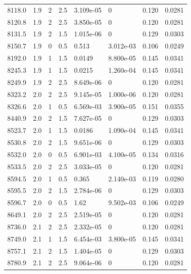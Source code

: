 \documentclass[preview]{standalone}
\begin{document}
{{{{{\begin{tabular}{L{1.2cm}C{1.2cm} C{0.3cm}C{0.5cm} C{1.4cm}C{1.4cm} C{1.4cm}C{1.4cm}}
  8118.0  &   1.9  & 2     & 2.5 &  3.109e-05  & 0  & 0.120 &  0.0281   \\ 
  8120.8  &   1.9  & 2     & 2.5 &  3.850e-05  & 0  & 0.120 &  0.0281   \\ 
  8131.5  &   1.9  & 2     & 1.5 &  1.015e-06  & 0  & 0.129 &  0.0303   \\ 
  8150.7  &   1.9  & 0     & 0.5 &  0.513  & 3.012e-03  & 0.106 &  0.0249   \\ 
  8192.0  &   1.9  & 1     & 1.5 &  0.0149  & 8.800e-05  & 0.145 &  0.0341   \\ 
  8245.3  &   1.9  & 1     & 1.5 &  0.0215  & 1.260e-04  & 0.145 &  0.0341   \\ 
  8249.9  &   1.9  & 2     & 2.5 &  8.649e-06  & 0  & 0.120 &  0.0281   \\ 
  8323.2  &   2.0  & 2     & 2.5 &  9.145e-05  & 1.000e-06  & 0.120 &  0.0281   \\ 
  8326.6  &   2.0  & 1     & 0.5 &  6.569e-03  & 3.900e-05  & 0.151 &  0.0355   \\ 
  8440.9  &   2.0  & 2     & 1.5 &  7.627e-05  & 0  & 0.129 &  0.0303   \\ 
  8523.7  &   2.0  & 1     & 1.5 &  0.0186  & 1.090e-04  & 0.145 &  0.0341   \\ 
  8530.8  &   2.0  & 2     & 1.5 &  9.651e-06  & 0  & 0.129 &  0.0303   \\ 
  8532.0  &   2.0  & 0     & 0.5 &  6.901e-03  & 4.100e-05  & 0.134 &  0.0316   \\ 
  8533.5  &   2.0  & 2     & 2.5 &  3.033e-05  & 0  & 0.120 &  0.0281   \\ 
  8594.5  &   2.0  & 1     & 0.5 &  0.365  & 2.140e-03  & 0.119 &  0.0280   \\ 
  8595.5  &   2.0  & 2     & 1.5 &  2.784e-06  & 0  & 0.129 &  0.0303   \\ 
  8596.7  &   2.0  & 0     & 0.5 &  1.62  & 9.502e-03  & 0.106 &  0.0249   \\ 
  8649.1  &   2.0  & 2     & 2.5 &  2.519e-05  & 0  & 0.120 &  0.0281   \\ 
  8736.0  &   2.1  & 2     & 2.5 &  2.332e-05  & 0  & 0.120 &  0.0281   \\ 
  8749.0  &   2.1  & 1     & 1.5 &  6.454e-03  & 3.800e-05  & 0.145 &  0.0341   \\ 
  8757.1  &   2.1  & 2     & 1.5 &  1.404e-05  & 0  & 0.129 &  0.0303   \\ 
  8780.9  &   2.1  & 2     & 2.5 &  9.064e-06  & 0  & 0.120 &  0.0281   \\ 

\end{tabular}}}}}}
\end{document}
